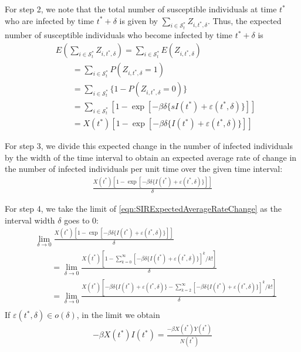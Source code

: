 \documentclass[fleqn]{article}\usepackage[]{graphicx}\usepackage[]{color}
\begin{document}
For step 2, we note that the total number of susceptible individuals at time $t^*$ who are infected by time $t^* + \delta$ is given by $\sum_{i \in \mathcal{S}_t^*} Z_{i, t^*, \delta}$.  Thus, the expected number of susceptible individuals who become infected by time $t^* + \delta$ is
\begin{align*}
&E\left(\sum_{i \in \mathcal{S}_t^*} Z_{i, t^*, \delta}\right) = \sum_{i \in \mathcal{S}_t^*} E(Z_{i, t^*, \delta}) \\
&\qquad = \sum_{i \in \mathcal{S}_t^*} P(Z_{i, t^*, \delta} = 1) \\
&\qquad = \sum_{i \in \mathcal{S}_t^*} \{ 1 - P(Z_{i, t^*, \delta} = 0) \} \\
&\qquad = \sum_{i \in \mathcal{S}_t^*} [ 1 - \exp \left[ - \beta \delta \{s I(t^*) + \varepsilon(t^*, \delta) \} \right] ] \\
&\qquad = X(t^*) \left[ 1 - \exp \left[ - \beta \delta \{ I(t^*) + \varepsilon(t^*, \delta) \} \right] \right]
\end{align*}

For step 3, we divide this expected change in the number of infected individuals by the width of the time interval to obtain an expected average rate of change in the number of infected individuals per unit time over the given time interval:
\begin{align}
\frac{X(t^*) \left[ 1 - \exp \left[ - \beta \delta \{ I(t^*) + \varepsilon(t^*, \delta) \} \right] \right]}{\delta} \label{eqn:SIRExpectedAverageRateChange}
\end{align}

For step 4, we take the limit of \eqref{eqn:SIRExpectedAverageRateChange} as the interval width $\delta$ goes to 0:
\begin{align*}
&\lim_{\delta \rightarrow 0} \frac{X(t^*) \left[ 1 - \exp \left[ - \beta \delta \{ I(t^*) + \varepsilon(t^*, \delta) \} \right] \right]}{\delta} \\
&\qquad = \lim_{\delta \rightarrow 0} \frac{X(t^*) \left[ 1 - \sum_{k = 0}^{\infty} \left[ - \beta \delta \{ I(t^*) + \varepsilon(t^*, \delta) \} \right]^k / k ! \right]}{\delta} \\
&\qquad = \lim_{\delta \rightarrow 0} \frac{X(t^*) \left[ - \beta \delta \{ I(t^*) + \varepsilon(t^*, \delta) \} - \sum_{k = 2}^{\infty} \left[ - \beta \delta \{ I(t^*) + \varepsilon(t^*, \delta) \} \right]^k / k ! \right]}{\delta} \\
\end{align*}
If $\varepsilon(t^*, \delta) \in o(\delta)$, in the limit we obtain 
\begin{align*}
- \beta X(t^*) I(t^*) = \frac{- \beta X(t^*) Y(t^*)}{N(t^*)}
\end{align*}
\end{document}

